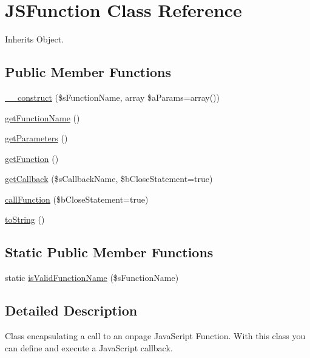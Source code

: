 \hypertarget{class_j_s_function}{\section{J\-S\-Function Class Reference}
\label{class_j_s_function}
}


Inherits Object.

\subsection*{Public Member Functions}
\begin{DoxyCompactItemize}
\item 
\hyperlink{class_j_s_function_ac9dc958434b754eb91570166baea4b83}{\-\_\-\-\_\-construct} (\$s\-Function\-Name, array \$a\-Params=array())
\item 
\hyperlink{class_j_s_function_a3c0720b6f99335be1f31e3dcd9158722}{get\-Function\-Name} ()
\item 
\hyperlink{class_j_s_function_ac64109018bb50dd46daa4edb9f64dee8}{get\-Parameters} ()
\item 
\hyperlink{class_j_s_function_a6b3f79ff3c91a373799474eb34b7e66d}{get\-Function} ()
\item 
\hyperlink{class_j_s_function_ab7e7c06eb044ab3bd1ab3ee8880aa940}{get\-Callback} (\$s\-Callback\-Name, \$b\-Close\-Statement=true)
\item 
\hyperlink{class_j_s_function_a93a20458a06de1cad66ba0eb98d6d540}{call\-Function} (\$b\-Close\-Statement=true)
\item 
\hyperlink{class_j_s_function_a87ff9cd433c24738e62f68ea28b1c0df}{to\-String} ()
\end{DoxyCompactItemize}
\subsection*{Static Public Member Functions}
\begin{DoxyCompactItemize}
\item 
static \hyperlink{class_j_s_function_ab83d99420a69ae7293df271732c01acf}{is\-Valid\-Function\-Name} (\$s\-Function\-Name)
\end{DoxyCompactItemize}


\subsection{Detailed Description}
Class encapsulating a call to an onpage Java\-Script Function. With this class you can define and execute a Java\-Script callback.

